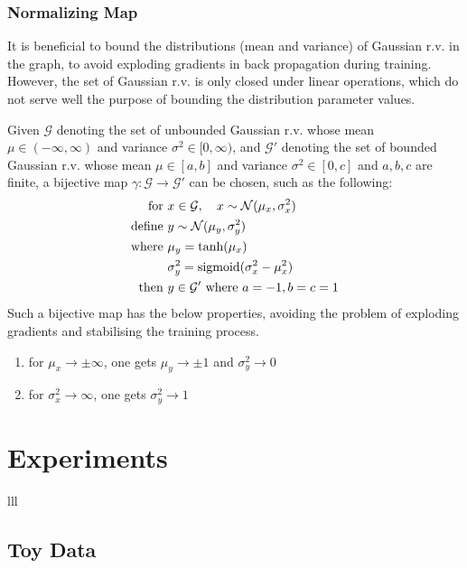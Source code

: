 \documentclass{article}
\begin{document}
\subsubsection{Normalizing Map}
It is beneficial to bound the distributions (mean and variance) of Gaussian r.v. in the graph, to avoid exploding gradients in back propagation during training. However, the set of Gaussian r.v. is only closed under linear operations, which do not serve well the purpose of bounding the distribution parameter values.

Given $\mathcal{G}$ denoting the set of unbounded Gaussian r.v. whose mean $\mu\in(-\infty,\infty) $ and variance $\sigma^2\in[0,\infty)$, and $\mathcal{G}'$ denoting the set of bounded Gaussian r.v. whose mean $\mu\in[a,b]$ and variance $\sigma^2\in[0,c]$ and $a,b,c$ are finite, a bijective map $\gamma: \mathcal{G} \rightarrow \mathcal{G}'$ can be chosen, such as the following:
\begin{equation}
    \begin{aligned}
        \text{for }&x\in\mathcal{G},\quad x\sim\mathcal{N}(\mu_x,\sigma_x^2) \\
        \text{define }&y\sim\mathcal{N}(\mu_y, \sigma_y^2) \\
        \text{where }&\mu_y = \text{tanh}(\mu_x) \\
                     &\sigma_y^2 = \text{sigmoid}(\sigma_x^2 - \mu_x^2) \\
        \text{then }&y\in\mathcal{G}' \text{ where }a=-1,\space b=c=1
    \end{aligned}
    \label{eq:normalizeMap}
\end{equation}
Such a bijective map has the below properties, avoiding the problem of exploding gradients and stabilising the training process.
\begin{enumerate}
    \item for $\mu_x\rightarrow\pm\infty$, one gets $\mu_y\rightarrow\pm 1$ and $\sigma_y^2\rightarrow 0$
    \item for $\sigma_x^2\rightarrow\infty$, one gets $\sigma_y^2\rightarrow 1$
\end{enumerate}

\section{Experiments}
lll
\subsection{Toy Data}
\end{document}

